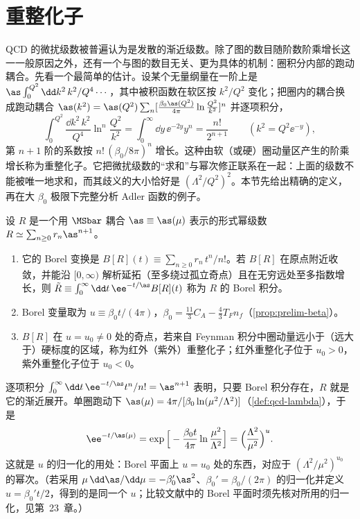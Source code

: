 \section{重整化子}\label{sec:power-renormalons}

QCD 的微扰级数被普遍认为是发散的渐近级数。除了图的数目随阶数阶乘增长这一一般原因之外，还有一个与图的数目无关、更为具体的机制：圈积分内部的跑动耦合。先看一个最简单的估计。设某个无量纲量在一阶上是 $\as\int_0^{Q^2}\dd k^2\,k^2/Q^4\cdots$，其中被积函数在软区按 $k^2/Q^2$ 变化；把圈内的耦合换成跑动耦合 $\as(k^2)=\as(Q^2)\sum_n[\frac{\beta_0\as(Q^2)}{4\pi}\ln\frac{Q^2}{k^2}]^n$ 并逐项积分，
\begin{equation*}
\int_0^{Q^2}\!\frac{\dd k^2\,k^2}{Q^4}\ln^n\frac{Q^2}{k^2}=\int_0^\infty\!\dd y\,\ee^{-2y}y^n=\frac{n!}{2^{n+1}}\qquad(k^2=Q^2\ee^{-y}),
\end{equation*}
第 $n+1$ 阶的系数按 $n!\,(\beta_0/8\pi)^n$ 增长。这种由软（或硬）圈动量区产生的阶乘增长称为重整化子\cite{tHooft1979}。它把微扰级数的“求和”与幂次修正联系在一起：上面的级数不能被唯一地求和，而其歧义的大小恰好是 $(\Lambda^2/Q^2)^2$。本节先给出精确的定义，再在大 $\beta_0$ 极限下完整分析 Adler 函数的例子。

\begin{definition}\label{def:power-borel}
设 $R$ 是一个用 $\MSbar$ 耦合 $\as\equiv\as(\mu)$ 表示的形式幂级数 $R\simeq\sum_{n\ge0}r_n\as^{n+1}$。
\begin{enumerate}[label=(\roman*),leftmargin=2em,itemsep=0pt,topsep=2pt]
\item 它的 Borel 变换是 $B[R](t)\equiv\sum_{n\ge0}r_n\,t^n/n!$。若 $B[R]$ 在原点附近收敛，并能沿 $[0,\infty)$ 解析延拓（至多绕过孤立奇点）且在无穷远处至多指数增长，则 $\tilde R\equiv\int_0^\infty\dd t\,\ee^{-t/\as}B[R](t)$ 称为 $R$ 的 Borel 积分。
\item Borel 变量取为 $u\equiv\beta_0t/(4\pi)$，$\beta_0=\frac{11}3C_A-\frac43T_Fn_f$（\cref{prop:prelim-beta}）。
\item $B[R]$ 在 $u=u_0\ne0$ 处的奇点，若来自 Feynman 积分中圈动量远小于（远大于）硬标度的区域，称为红外（紫外）重整化子；红外重整化子位于 $u_0>0$，紫外重整化子位于 $u_0<0$。
\end{enumerate}
\end{definition}

逐项积分 $\int_0^\infty\dd t\,\ee^{-t/\as}t^n/n!=\as^{n+1}$ 表明，只要 Borel 积分存在，$R$ 就是它的渐近展开。单圈跑动下 $\as(\mu)=4\pi/[\beta_0\ln(\mu^2/\Lambda^2)]$（\cref{def:qcd-lambda}），于是
\begin{equation}\label{eq:power-borel-lambda}
\ee^{-t/\as(\mu)}=\exp\Big[-\frac{\beta_0t}{4\pi}\ln\frac{\mu^2}{\Lambda^2}\Big]=\Big(\frac{\Lambda^2}{\mu^2}\Big)^{u}.
\end{equation}
这就是 $u$ 的归一化的用处：Borel 平面上 $u=u_0$ 处的东西，对应于 $(\Lambda^2/\mu^2)^{u_0}$ 的幂次。（若采用 $\mu\,\dd\as/\dd\mu=-\beta_0'\as^2$、$\beta_0'=\beta_0/(2\pi)$ 的归一化并定义 $u=\beta_0't/2$，得到的是同一个 $u$；比较文献中的 Borel 平面时须先核对所用的归一化，见第~23~章。）

